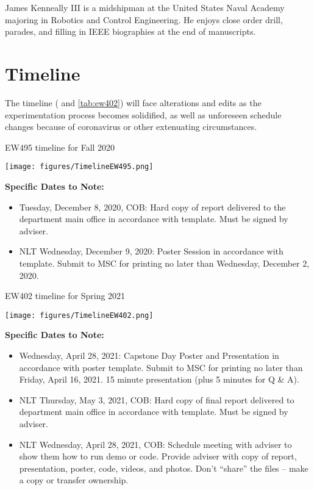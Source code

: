 \documentclass{IEEEtran}
\begin{document}

\begin{IEEEbiography}{James Kenneally III} is a midshipman at the United States Naval Academy majoring in Robotics and Control Engineering. He enjoys close order drill, parades, and filling in IEEE biographies at the end of manuscripts.  
\end{IEEEbiography}


\appendices
\section{Timeline}
\label{app:A}
The timeline ( and \ref{tab:ew402}) will face alterations and edits as the experimentation process becomes solidified, as well as unforeseen schedule changes because of coronavirus or other extenuating circumstances.

\begin{table*}
\caption{EW495 timeline for Fall 2020}
\label{tab:ew495}
\begin{center}
\texttt{[image: figures/TimelineEW495.png]}
\end{center}
\noindent\textbf{Specific Dates to Note:}
\begin{itemize}
\item Tuesday, December 8, 2020, COB:  Hard copy of report delivered to the department main office in accordance with template. Must be signed by adviser. 
\item NLT Wednesday, December 9, 2020: Poster Session in accordance with template.  Submit to MSC for printing no later than Wednesday, December 2, 2020.
\end{itemize}
\end{table*}

\begin{table*}
\caption{EW402 timeline for Spring 2021}
\label{tab:ew402}
\begin{center}
\texttt{[image: figures/TimelineEW402.png]}
\end{center}
\noindent\textbf{Specific Dates to Note:}
\begin{itemize}
\item Wednesday, April 28, 2021:  Capstone Day Poster and Presentation in accordance with poster template.  Submit to MSC for printing no later than Friday, April 16, 2021.  15 minute presentation (plus 5 minutes for Q \& A). 
\item NLT Thursday, May 3, 2021, COB:  Hard copy of final report delivered to department main office in accordance with template. Must be signed by adviser. 
\item NLT Wednesday, April 28, 2021, COB:  Schedule meeting with adviser to show them how to run demo or code. Provide adviser with copy of report, presentation, poster, code, videos, and photos.   Don’t ``share'' the files -- make a copy or transfer ownership.  
\end{itemize}
\end{table*}
\end{document}
